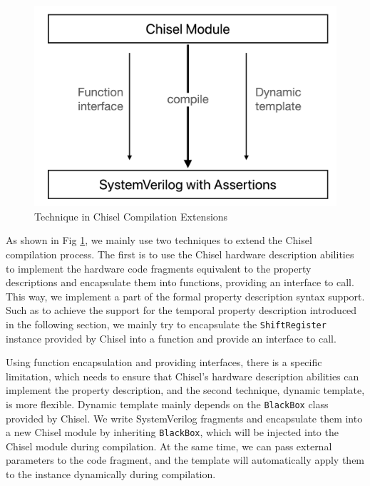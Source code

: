 \documentclass[conference]{IEEEtran}
\theoremstyle{definition}
\begin{document}
\begin{figure}[!htbp]
    \begin{center}
    \includegraphics[width=0.9\linewidth]{pics/ChiselFVSubstitute.png}
    \caption{Technique in Chisel Compilation Extensions}
    \label{fig: ChiselFVSubstitute}
    \end{center}
\end{figure}

As shown in Fig \ref{fig: ChiselFVSubstitute}, we mainly use two techniques to extend the Chisel compilation process. The first is to use the Chisel hardware description abilities to implement the hardware code fragments equivalent to the property descriptions and encapsulate them into functions, providing an interface to call. This way, we implement a part of the formal property description syntax support.
Such as to achieve the support for the temporal property description introduced in the following section, we mainly try to encapsulate the \verb|ShiftRegister| instance provided by Chisel into a function and provide an interface to call.

Using function encapsulation and providing interfaces, there is a specific limitation, which needs to ensure that Chisel's hardware description abilities can implement the property description, and the second technique, dynamic template, is more flexible.
Dynamic template mainly depends on the \verb|BlackBox| class provided by Chisel. We write SystemVerilog fragments and encapsulate them into a new Chisel module by inheriting \verb|BlackBox|, which will be injected into the Chisel module during compilation. At the same time, we can pass external parameters to the code fragment, and the template will automatically apply them to the instance dynamically during compilation.
\end{document}
